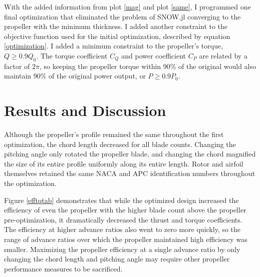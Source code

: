 \documentclass[journal ]{new-aiaa}
\begin{document}
With the added information from plot \eqref{mag} and plot \eqref{same}, I programmed one final optimization that eliminated the problem of SNOW.jl converging to the propeller with the minimum thickness. I added another constraint to the objective function used for the initial optimization, described by equation \eqref{optimization}. I added a minimum constraint to the propeller's torque, $Q \geq 0.9 Q_{0}$. The torque coefficient $C_{Q}$ and power coefficient $C_{P}$ are related by a factor of $2 \pi$, so keeping the propeller torque within 90\% of the original would also maintain 90\% of the original power output, or $P \geq 0.9 P_{0}$.


\section{Results and Discussion}

Although the propeller's profile remained the same throughout the first optimization, the chord length decreased for all blade counts. Changing the pitching angle only rotated the propeller blade, and changing the chord magnified the size of its entire profile uniformly along its entire length. Rotor and airfoil themselves retained the same NACA and APC identification numbers throughout the optimization.

Figure \eqref{efftqtab} demonstrates that while the optimized design increased the efficiency of even the propeller with the higher blade count above the propeller pre-optimization, it dramatically decreased the thrust and torque coefficients. The efficiency at higher advance ratios also went to zero more quickly, so the range of advance ratios over which the propeller maintained high efficiency was smaller. Maximizing the propeller efficiency at a single advance ratio by only changing the chord length and pitching angle may require other propeller performance measures to be sacrificed.
\end{document}
